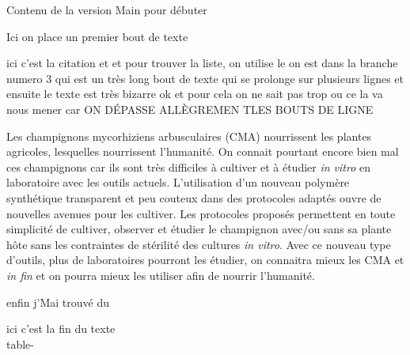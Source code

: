 \documentclass{sn-jnl}%
\begin{document}
Contenu de la version Main pour débuter



	Ici on place un premier bout de texte

 ici c'est la citation \cite{declerck_vitro_2005}et
\cite{fortin_arbuscular_2002}et pour trouver la liste,
\cite{silvani_novel_2019}on utilise le on est dans la branche numero 3 qui est
un très long bout de texte qui se prolonge sur plusieurs lignes et ensuite le
texte est très bizarre ok et pour cela on ne sait pas trop ou ce la va nous
mener car ON DÉPASSE ALLÈGREMEN TLES BOUTS DE LIGNE 



 Les champignons mycorhiziens arbusculaires (CMA) nourrissent les plantes
agricoles, lesquelles nourrissent l'humanité. On connait pourtant encore bien
mal ces champignons car ils sont très difficiles à cultiver et à étudier
\emph{in vitro} en laboratoire avec les outils actuels. L'utilisation d'un
nouveau polymère synthétique transparent et peu couteux dans des protocoles
adaptés ouvre de nouvelles avenues pour les cultiver. Les protocoles proposés
permettent en toute simplicité de cultiver, observer et étudier le champignon
avec/ou sans sa plante hôte sans les contraintes de stérilité des cultures
\textit{in vitro}. Avec ce nouveau type d'outils, plus de laboratoires pourront
les étudier, on connaitra mieux les CMA et \textit{in fin} et on pourra mieux
les utiliser afin de nourrir l'humanité.





enfin j'Mai trouvé du 


	ici c'est la fin du texte\\

	table-
\end{document}
